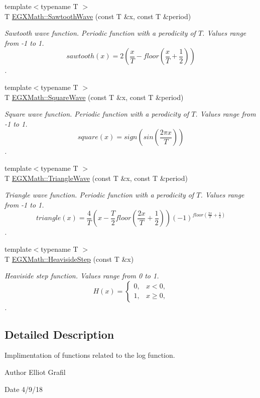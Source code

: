 \begin{DoxyCompactItemize}
\item 
{\footnotesize template$<$typename T $>$ }\\T \mbox{\hyperlink{group___e_g_x_math-_functions-_periodic_ga3eab4a0455f64881f9c183987682d85c}{E\+G\+X\+Math\+::\+Sawtooth\+Wave}} (const T \&x, const T \&period)
\begin{DoxyCompactList}\small\item\em Sawtooth wave function. Periodic function with a perodicity of $T$. Values range from -\/1 to 1. \[sawtooth(x)=2(\frac{x}{T} - floor(\frac{x}{T} + \frac{1}{2}))\]. \end{DoxyCompactList}\item 
{\footnotesize template$<$typename T $>$ }\\T \mbox{\hyperlink{group___e_g_x_math-_functions-_periodic_ga3bdc6c02d347f48f91bca886448db33a}{E\+G\+X\+Math\+::\+Square\+Wave}} (const T \&x, const T \&period)
\begin{DoxyCompactList}\small\item\em Square wave function. Periodic function with a perodicity of $T$. Values range from -\/1 to 1. \[square(x)= sign( sin (\frac{2 \pi x}{T})) \]. \end{DoxyCompactList}\item 
{\footnotesize template$<$typename T $>$ }\\T \mbox{\hyperlink{group___e_g_x_math-_functions-_periodic_gafa81ebd66ef7cd080370fad972d6ac50}{E\+G\+X\+Math\+::\+Triangle\+Wave}} (const T \&x, const T \&period)
\begin{DoxyCompactList}\small\item\em Triangle wave function. Periodic function with a perodicity of $T$. Values range from -\/1 to 1. \[triangle(x)= \frac{4}{T}(x-\frac{T}{2} floor(\frac{2 x}{T}+\frac{1}{2}) )(-1)^{floor(\frac{2 x}{T}+\frac{1}{2})} \]. \end{DoxyCompactList}\item 
{\footnotesize template$<$typename T $>$ }\\T \mbox{\hyperlink{group___e_g_x_math-_functions-_periodic_ga0fb325d5423606e9c222e1ebd6a65833}{E\+G\+X\+Math\+::\+Heaviside\+Step}} (const T \&x)
\begin{DoxyCompactList}\small\item\em Heaviside step function. Values range from 0 to 1. \[H(x)=\begin{cases} 0, & x < 0, \\ 1, & x \ge 0, \end{cases} \]. \end{DoxyCompactList}\end{DoxyCompactItemize}


\subsection{Detailed Description}
Implimentation of functions related to the log function. 

\begin{DoxyAuthor}{Author}
Elliot Grafil 
\end{DoxyAuthor}
\begin{DoxyDate}{Date}
4/9/18 
\end{DoxyDate}
